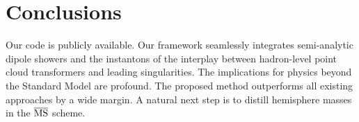 \section{Conclusions}\label{sec:conclusions}

Our code is publicly available. Our framework seamlessly integrates
semi-analytic dipole showers and the instantons of the interplay between
hadron-level point cloud transformers and leading singularities. The
implications for physics beyond the Standard Model are profound. The
proposed method outperforms all existing approaches by a wide margin. A
natural next step is to distill hemisphere masses in the $\overline{\rm
MS}$ scheme.

